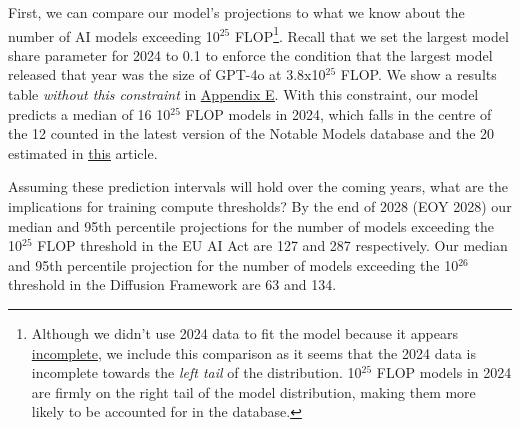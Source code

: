 \documentclass[11pt]{article}
\begin{document}
First, we can compare our model's projections to what we know about the number of AI models exceeding 10$^{25}$ FLOP\footnote{Although we didn't use 2024 data to fit the model because it appears \hyperref[appendix-a-historical-distribution-of-notable-models-and-fit-data-choice]{incomplete}, we include this comparison as it seems that the 2024 data is incomplete towards the \textit{left tail} of the distribution. 10$^{25}$ FLOP models in 2024 are firmly on the right tail of the model distribution, making them more likely to be accounted for in the database.}. Recall that we set the largest model share parameter for 2024 to 0.1 to enforce the condition that the largest model released that year was the size of GPT-4o at 3.8x10$^{25}$ FLOP. We show a results table \textit{without this constraint} in \underline{\hyperref[appendix-e-2024-predictions-under-uniform-sampling-of-lms]{Appendix E}}. With this constraint, our model predicts a median of 16 10$^{25}$ FLOP models in 2024, which falls in the centre of the 12 counted in the latest version of the Notable Models database and the 20 estimated in \underline{\href{https://epoch.ai/data-insights/models-over-1e25-flop}{this}} article.

Assuming these prediction intervals will hold over the coming years, what are the implications for training compute thresholds? By the end of 2028 (EOY 2028) our median and 95th percentile projections for the number of models exceeding the 10$^{25}$ FLOP threshold in the EU AI Act are 127 and 287 respectively. Our median and 95th percentile projection for the number of models exceeding the 10$^{26}$ threshold in the Diffusion Framework are 63 and 134.
\end{document}
